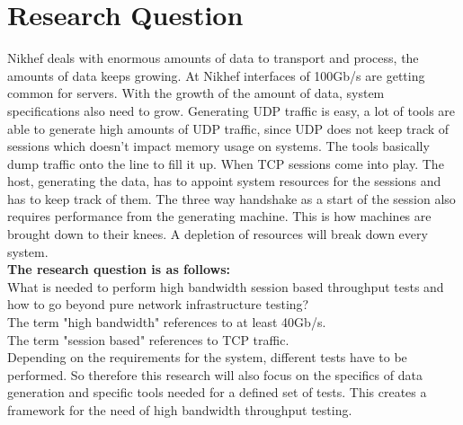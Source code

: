 \section{Research Question}

Nikhef deals with enormous amounts of data to transport and process, the amounts of data keeps growing.  
At Nikhef interfaces of 100Gb/s are getting common for servers.
With the growth of the amount of data, system specifications also need to grow.
Generating UDP traffic is easy, a lot of tools are able to generate high amounts of UDP traffic, since UDP does not keep track of sessions which doesn't impact memory usage on systems. The tools basically dump traffic onto the line to fill it up. When TCP sessions come into play.
The host, generating the data, has to appoint system resources for the sessions and has to keep track of them. The three way handshake as a start of the session also requires performance from the generating machine. This is how machines are brought down to their knees. A depletion of resources will break down every system. \\
  
\textbf{The research question is as follows:}\\
What is needed to perform high bandwidth session based throughput tests and how to go beyond pure network infrastructure testing? \\

The term "high bandwidth" references to at least 40Gb/s. \\
The term "session based" references to TCP traffic. \\

Depending on the requirements for the system, different tests have to be performed. 
So therefore this research will also focus on the specifics of data generation and specific tools needed for a defined set of tests. This creates a framework for the need of high bandwidth throughput testing.  

